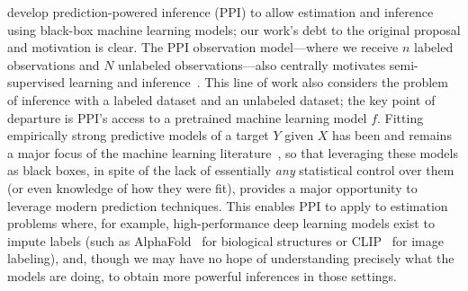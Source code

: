 \citet{AngelopoulosBaFaJoZr23} develop prediction-powered inference (PPI)
to allow estimation and inference using black-box machine learning models;
our work's debt to the original proposal and motivation is clear.
%
The PPI observation model---where we receive $n$ labeled observations and
$N$ unlabeled observations---also centrally motivates semi-supervised
learning and inference~\cite{ZhangBrCa19, ZhangBr22, SongLiZh23}.
%
This line of work also considers the problem of inference with a labeled
dataset and an unlabeled dataset; the key point of departure is PPI's access
to a pretrained machine learning model $f$.
%
Fitting empirically strong predictive models of a target $Y$ given $X$ has
been and remains a major focus of the machine learning
literature~\cite{LeCunBeHi15}, so that leveraging these
models as black boxes, in spite of the lack of essentially \emph{any}
statistical control over them (or even knowledge of how they were fit),
provides a major opportunity to leverage modern prediction techniques.
%
This enables PPI to apply to estimation problems where, for example,
high-performance deep learning models exist to impute labels (such as
AlphaFold~\cite{JumperEvEtAl21} for biological structures or
CLIP~\cite{RadfordKiHaRaGoAgSaAsMiClKrSu21} for image labeling), and, though we may have no
hope of understanding precisely what the models are doing, to obtain more
powerful inferences in those settings.

\newcommand{\thetaAIPW}{\hat{\theta}^{\textup{AIPW}}}


